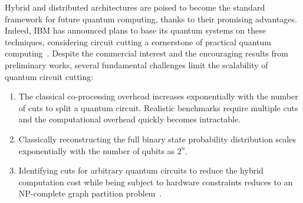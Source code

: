 Hybrid and distributed architectures are poised to become the standard framework for future quantum computing,
thanks to their promising advantages.
Indeed, IBM has announced plans to base its quantum systems on these techniques,
considering circuit cutting a cornerstone of practical quantum computing~\cite{bravyi2022future}.
Despite the commercial interest and the encouraging results from preliminary works,
several fundamental challenges limit the scalability of quantum circuit cutting:
\begin{enumerate}
   \item The classical co-processing overhead increases exponentially with the number of cuts to split a quantum circuit.
   Realistic benchmarks require multiple cuts and the computational overhead quickly becomes intractable.

   \item Classically reconstructing the full binary state probability distribution scales exponentially with the number of qubits as $2^n$.
   \item Identifying cuts for arbitrary quantum circuits to reduce the hybrid computation cost while being subject to hardware constraints
   reduces to an NP-complete graph partition problem~\cite{karypis1998fast}.
   
\end{enumerate}

